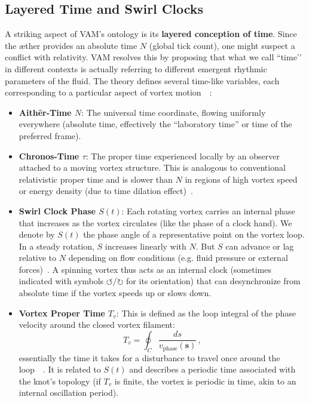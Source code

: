 \documentclass[preprint]{revtex4-2}
\begin{document}
    \subsection{Layered Time and Swirl Clocks}
    A striking aspect of VAM’s ontology is its \textbf{layered conception of time}. Since the æther provides an absolute time $N$ (global tick count), one might suspect a conflict with relativity. VAM resolves this by proposing that what we call ``time’’ in different contexts is actually referring to different emergent rhythmic parameters of the fluid. The theory defines several time-like variables, each corresponding to a particular aspect of vortex motion~\cite{reference_42}~\cite{reference_43}:
    \begin{itemize}
        \item \textbf{Aithēr-Time $N$}: The universal time coordinate, flowing uniformly everywhere (absolute time, effectively the “laboratory time” or time of the preferred frame).
        \item \textbf{Chronos-Time $\tau$}: The proper time experienced locally by an observer attached to a moving vortex structure. This is analogous to conventional relativistic proper time and is slower than $N$ in regions of high vortex speed or energy density (due to time dilation effect)~\cite{reference_44}.
        \item \textbf{Swirl Clock Phase $S(t)$}: Each rotating vortex carries an internal phase that increases as the vortex circulates (like the phase of a clock hand). We denote by $S(t)$ the phase angle of a representative point on the vortex loop. In a steady rotation, $S$ increases linearly with $N$. But $S$ can advance or lag relative to $N$ depending on flow conditions (e.g. fluid pressure or external forces)~\cite{reference_45}. A spinning vortex thus acts as an internal clock (sometimes indicated with symbols $\circlearrowleft/\circlearrowright$ for its orientation) that can desynchronize from absolute time if the vortex speeds up or slows down.
        \item \textbf{Vortex Proper Time $T_v$}: This is defined as the loop integral of the phase velocity around the closed vortex filament:
        \begin{equation}
            T_v = \oint_C \frac{ds}{v_{\text{phase}}(\mathbf{s})}\,,
        \end{equation}
        essentially the time it takes for a disturbance to travel once around the loop~\cite{reference_46}~\cite{reference_47}. It is related to $S(t)$ and describes a periodic time associated with the knot’s topology (if $T_v$ is finite, the vortex is periodic in time, akin to an internal oscillation period).

\end{itemize}
\end{document}
